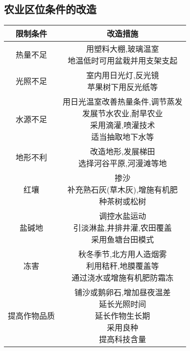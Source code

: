 \documentclass[a4paper]{article}
\begin{document}
    \subsection{农业区位条件的改造}
        \begin{tabular}{|c|c|}
            \hline
            限制条件  & 改造措施    \\
            \hline
            热量不足  &  \makecell[c]{用塑料大棚,玻璃温室\\地温低时可用盆栽并用支架支起}   \\
            \hline
            光照不足  & \makecell[c]{室内用日光灯,反光镜\\苹果树下用反光纸等}    \\
            \hline
            水源不足  & \makecell[c]{用日光温室改善热量条件,调节蒸发\\发展节水农业,耐旱农业\\采用滴灌,喷灌技术\\适当抽取地下水等}    \\
            \hline
            地形不利  &  \makecell[c]{改造地形,发展梯田\\选择河谷平原,河漫滩等地}   \\
            \hline
            红壤  &  \makecell[c]{掺沙\\补充熟石灰(草木灰),增施有机肥\\种茶树或松树}    \\
            \hline
            盐碱地  & \makecell[c]{调控水盐运动\\引淡淋盐,井排井灌,农田覆盖\\采用鱼塘台田模式}   \\
            \hline
            冻害  & \makecell[c]{秋冬季节,北方用人造烟雾\\利用秸秆,地膜覆盖等\\通过浇水或增施有机肥防霜冻}  \\
            \hline
            提高作物品质 & \makecell[c]{铺沙或鹅卵石,增加昼夜温差\\延长光照时间\\延长作物生长期\\采用良种\\提高科技含量}    \\
            \hline
        \end{tabular}
\end{document}
